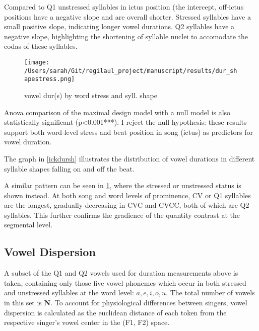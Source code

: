 Compared to Q1 unstressed syllables in ictus position (the intercept,  off-ictus positions have a negative slope and are overall shorter. Stressed syllables have a small positive slope, indicating longer vowel durations. Q2 syllables have a negative slope, highlighting the shortening of syllable nuclei to accomodate the codas of these syllables. 


\begin{figure}[htbp]
\centering
\texttt{[image: /Users/sarah/Git/regilaul\_project/manuscript/results/dur\_shapestress.png]}
\caption{vowel dur(s) by word stress and syll. shape}
\label{strdursh}

\end{figure}
Anova comparison of the maximal design model with a null model is also statistically significant (p<0.001***). I reject the null hypothesis: these results support both word-level stress and beat position in song (ictus) as predictors for vowel duration. 

The graph in \ref{ickdursh} illustrates the distribution of vowel durations in different syllable shapes falling on and off the beat. 

A similar pattern can be seen in \ref{strdursh}, where the stressed or unstressed status is shown instead. At both song and word levels of prominence, CV or Q1 syllables are the longest, gradually decreasing in CVC and CVCC, both of which are Q2 syllables.  This further confirms the gradience of the quantity contrast at the segmental level. 




%

\subsection{Vowel Dispersion}
A subset of the Q1 and Q2 vowels used for duration measurements above is taken,  containing only those five vowel phonemes which occur in both stressed and unstressed syllables at the word level: \(a, e, i, o, u\). The total number of vowels in this set is {\bf N}.
To account for physiological differences between singers, vowel dispersion is calculated as the euclidean distance of each token from the respective singer's vowel center in the (F1, F2) space. 


